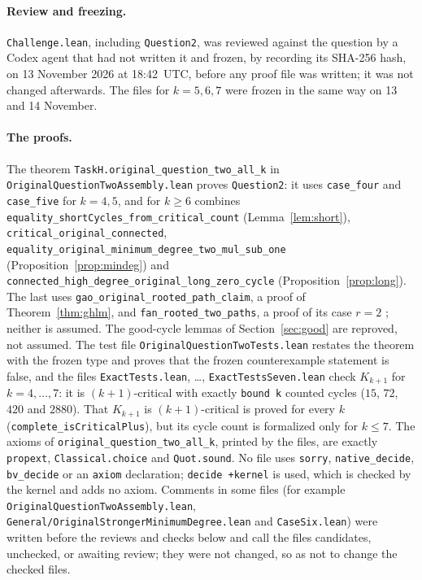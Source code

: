 \documentclass[11pt]{article}
\theoremstyle{remark}
\begin{document}
\paragraph{Review and freezing.}
\texttt{Challenge.lean}, including \texttt{Question2}, was reviewed against the
question by a Codex agent that had not written it and frozen, by recording its
SHA-256 hash, on 13 November 2026 at 18:42~UTC, before any proof file was
written; it was not changed afterwards. The files for $k=5,6,7$ were frozen in
the same way on 13 and 14 November.

\paragraph{The proofs.}
The theorem
\texttt{TaskH.\allowbreak original\_\allowbreak question\_\allowbreak two\_\allowbreak all\_\allowbreak k} in
\texttt{Original\allowbreak QuestionTwo\allowbreak Assembly.lean} proves \texttt{Question2}: it uses
\texttt{case\_\allowbreak four} and \texttt{case\_\allowbreak five} for $k=4,5$, and for $k\ge6$
combines \texttt{equality\_\allowbreak shortCycles\_\allowbreak from\_\allowbreak critical\_\allowbreak count}
(Lemma~\ref{lem:short}),
\texttt{critical\_\allowbreak original\_\allowbreak connected},
\texttt{equality\_\allowbreak original\_\allowbreak minimum\_\allowbreak degree\_\allowbreak two\_\allowbreak mul\_\allowbreak sub\_\allowbreak one}
(Proposition~\ref{prop:mindeg}) and
\texttt{connected\_\allowbreak high\_\allowbreak degree\_\allowbreak original\_\allowbreak long\_\allowbreak zero\_\allowbreak cycle}
(Proposition~\ref{prop:long}). The last uses
\texttt{gao\_\allowbreak original\_\allowbreak rooted\_\allowbreak path\_\allowbreak claim}, a proof of
Theorem~\ref{thm:ghlm}, and \texttt{fan\_\allowbreak rooted\_\allowbreak two\_\allowbreak paths}, a proof of its
case $r=2$ \cite[Theorem~2.1]{ghlm}; neither is assumed. The good-cycle lemmas of Section~\ref{sec:good} are
reproved, not assumed. The test file \texttt{OriginalQuestionTwoTests.lean}
restates the theorem with the frozen type and proves that the frozen
counterexample statement is false, and the files
\texttt{ExactTests.lean}, \ldots, \texttt{ExactTestsSeven.lean} check
$K_{k+1}$ for $k=4,\dots,7$: it is $(k+1)$-critical with exactly
\texttt{bound k} counted cycles ($15$, $72$, $420$ and $2880$). That $K_{k+1}$ is
$(k+1)$-critical is proved for every $k$ (\texttt{complete\_\allowbreak isCriticalPlus}),
but its cycle count is formalized only for $k\le7$. The axioms of
\texttt{original\_\allowbreak question\_\allowbreak two\_\allowbreak all\_\allowbreak k}, printed by the files, are exactly
\texttt{propext}, \texttt{Classical.choice} and \texttt{Quot.sound}. No file
uses \texttt{sorry}, \texttt{native\_\allowbreak decide}, \texttt{bv\_\allowbreak decide} or an
\texttt{axiom} declaration; \texttt{decide +kernel} is used, which is checked
by the kernel and adds no axiom. Comments in some files (for example
\texttt{Original\allowbreak QuestionTwo\allowbreak Assembly.lean},
\texttt{General/\allowbreak OriginalStrongerMinimumDegree.lean} and
\texttt{CaseSix.lean}) were written before the reviews and checks below and
call the files candidates, unchecked, or awaiting review; they were not
changed, so as not to change the checked files.
\end{document}

